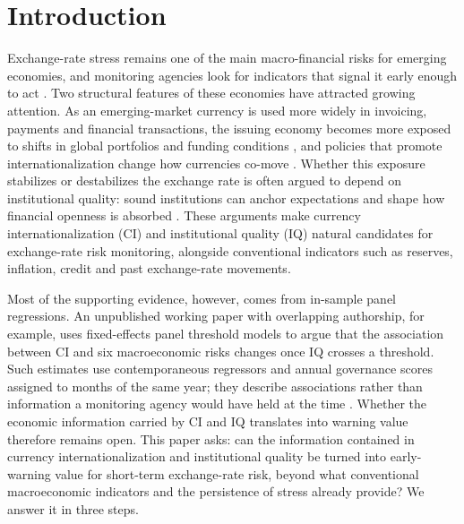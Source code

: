 \documentclass[preprint,12pt,authoryear]{elsarticle}
\begin{document}
\section{Introduction}
Exchange-rate stress remains one of the main macro-financial risks for emerging economies, and monitoring agencies look for indicators that signal it early enough to act \citep{kaminsky1998,frankel1996}. Two structural features of these economies have attracted growing attention. As an emerging-market currency is used more widely in invoicing, payments and financial transactions, the issuing economy becomes more exposed to shifts in global portfolios and funding conditions \citep{eichengreen2018}, and policies that promote internationalization change how currencies co-move \citep{an2024}. Whether this exposure stabilizes or destabilizes the exchange rate is often argued to depend on institutional quality: sound institutions can anchor expectations and shape how financial openness is absorbed \citep{chinn2006,aman2024}. These arguments make currency internationalization (CI) and institutional quality (IQ) natural candidates for exchange-rate risk monitoring, alongside conventional indicators such as reserves, inflation, credit and past exchange-rate movements.

Most of the supporting evidence, however, comes from in-sample panel regressions. An unpublished working paper with overlapping authorship, for example, uses fixed-effects panel threshold models \citep{hansen1999} to argue that the association between CI and six macroeconomic risks changes once IQ crosses a threshold. Such estimates use contemporaneous regressors and annual governance scores assigned to months of the same year; they describe associations rather than information a monitoring agency would have held at the time \citep{croushore2001}. Whether the economic information carried by CI and IQ translates into warning value therefore remains open. This paper asks: can the information contained in currency internationalization and institutional quality be turned into early-warning value for short-term exchange-rate risk, beyond what conventional macroeconomic indicators and the persistence of stress already provide? We answer it in three steps.
\end{document}
